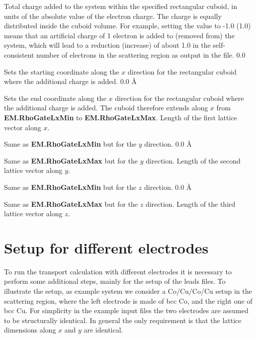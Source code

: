\documentclass[11pt]{article}
\begin{document}
{Total charge added to the system within the specified rectangular cuboid, in units of the absolute value of the electron charge. The charge is equally distributed inside the cuboid volume. For example, setting the value to -1.0 (1.0) means that an artificial charge of 1 electron is added to (removed from) the system, which will lead to a reduction (increase) of about 1.0 in the self-consistent number of electrons in the scattering region as output in the  file.}
{0.0}

{Sets the starting coordinate along the $x$ direction for the rectangular cuboid where the additional charge is added.}
{0.0 \AA}

{Sets the end coordinate along the $x$ direction for the rectangular cuboid where the additional charge is added. The cuboid therefore extends along $x$ from {\bf EM.RhoGateLxMin} to {\bf EM.RhoGateLxMax}.}
{Length of the first lattice vector along $x$.}

{Same as {\bf EM.RhoGateLxMin} but for the $y$ direction.}
{0.0 \AA}

{Same as {\bf EM.RhoGateLxMax} but for the $y$ direction.}
{Length of the second lattice vector along $y$.}

{Same as {\bf EM.RhoGateLxMin} but for the $z$ direction.}
{0.0 \AA}

{Same as {\bf EM.RhoGateLxMax} but for the $z$ direction.}
{Length of the third lattice vector along $z$.}


\newpage
\section {Setup for different electrodes}
\label{sec:diffele}

To run the transport calculation with different electrodes it is necessary to perform some additional steps, mainly for the setup of the leads files. To illustrate the setup, as example system we consider a Co/Cu/Co/Cu setup in the scattering region, where the left electrode is made of bcc Co, and the right one of bcc Cu. For simplicity in the example input files the two electrodes are assumed to be structurally identical. In general the only requirement is that the lattice dimensions along $x$ and $y$ are identical.
\end{document}
